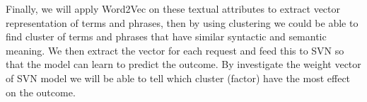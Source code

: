 Finally, we will apply Word2Vec on these textual attributes to extract vector representation of terms and phrases, then by using clustering we could be able to find cluster of terms and phrases that have similar syntactic and semantic meaning. We then extract the  vector for each request and feed this to SVN so that the model can learn to predict the outcome. By investigate the weight vector of SVN model we will be able to tell which cluster (factor) have the most effect on the outcome.


